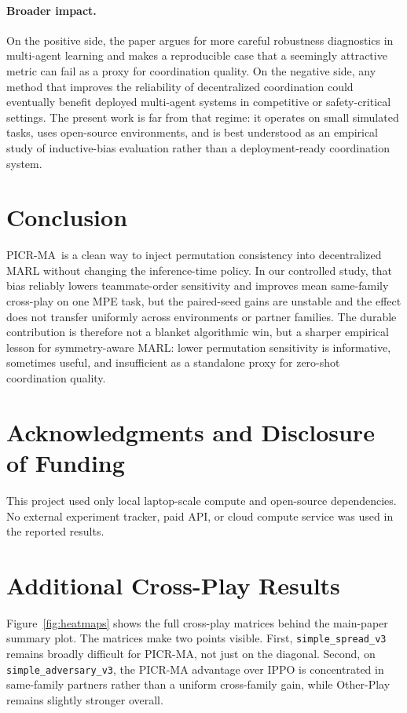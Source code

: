 \documentclass{article}
\newcommand{\method}{PICR-MA}
\begin{document}
\paragraph{Broader impact.}
On the positive side, the paper argues for more careful robustness diagnostics in multi-agent learning and makes a reproducible case that a seemingly attractive metric can fail as a proxy for coordination quality. On the negative side, any method that improves the reliability of decentralized coordination could eventually benefit deployed multi-agent systems in competitive or safety-critical settings. The present work is far from that regime: it operates on small simulated tasks, uses open-source environments, and is best understood as an empirical study of inductive-bias evaluation rather than a deployment-ready coordination system.

\section{Conclusion}
\method\ is a clean way to inject permutation consistency into decentralized MARL without changing the inference-time policy. In our controlled study, that bias reliably lowers teammate-order sensitivity and improves mean same-family cross-play on one MPE task, but the paired-seed gains are unstable and the effect does not transfer uniformly across environments or partner families. The durable contribution is therefore not a blanket algorithmic win, but a sharper empirical lesson for symmetry-aware MARL: lower permutation sensitivity is informative, sometimes useful, and insufficient as a standalone proxy for zero-shot coordination quality.

\section*{Acknowledgments and Disclosure of Funding}
This project used only local laptop-scale compute and open-source dependencies. No external experiment tracker, paid API, or cloud compute service was used in the reported results.




\appendix

\section{Additional Cross-Play Results}
Figure~\ref{fig:heatmaps} shows the full cross-play matrices behind the main-paper summary plot. The matrices make two points visible. First, \texttt{simple\_spread\_v3} remains broadly difficult for PICR-MA, not just on the diagonal. Second, on \texttt{simple\_adversary\_v3}, the PICR-MA advantage over IPPO is concentrated in same-family partners rather than a uniform cross-family gain, while Other-Play remains slightly stronger overall.
\end{document}
